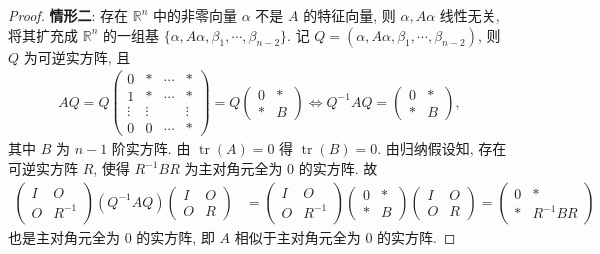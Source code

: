 \documentclass[../../main.tex]{subfiles}%
\begin{document}
\begin{proof}
\textbf{情形二}: 存在 $\mathbb{R}^n$ 中的非零向量 $\alpha$ 不是 $A$ 的特征向量, 则 $\alpha,A\alpha$ 线性无关, 将其扩充成 $\mathbb{R}^n$ 的一组基 $\{\alpha,A\alpha,\beta_1,\cdots,\beta_{n-2}\}$. 记 $Q=(\alpha,A\alpha,\beta_1,\cdots,\beta_{n-2})$, 则 $Q$ 为可逆实方阵, 且
\begin{align*}
AQ = Q\begin{pmatrix}
0 & * & \cdots & * \\
1 & * & \cdots & * \\
\vdots & \vdots & & \vdots \\
0 & 0 & \cdots & *
\end{pmatrix}
= Q\begin{pmatrix}
0 & * \\
* & B
\end{pmatrix}
\Longleftrightarrow Q^{-1}AQ = \begin{pmatrix}
0 & * \\
* & B
\end{pmatrix},
\end{align*}
其中 $B$ 为 $n-1$ 阶实方阵. 由 $\operatorname{tr}(A)=0$ 得 $\operatorname{tr}(B)=0$. 由归纳假设知, 存在可逆实方阵 $R$, 使得 $R^{-1}BR$ 为主对角元全为 $0$ 的实方阵. 故
\begin{align*}
\begin{pmatrix}
I & O \\
O & R^{-1}
\end{pmatrix}
(Q^{-1}AQ)
\begin{pmatrix}
I & O \\
O & R
\end{pmatrix}
&=
\begin{pmatrix}
I & O \\
O & R^{-1}
\end{pmatrix}
\begin{pmatrix}
0 & * \\
* & B
\end{pmatrix}
\begin{pmatrix}
I & O \\
O & R
\end{pmatrix}
=
\begin{pmatrix}
0 & * \\
* & R^{-1}BR
\end{pmatrix}
\end{align*}
也是主对角元全为 $0$ 的实方阵, 即 $A$ 相似于主对角元全为 $0$ 的实方阵.
\end{proof}
\end{document}
